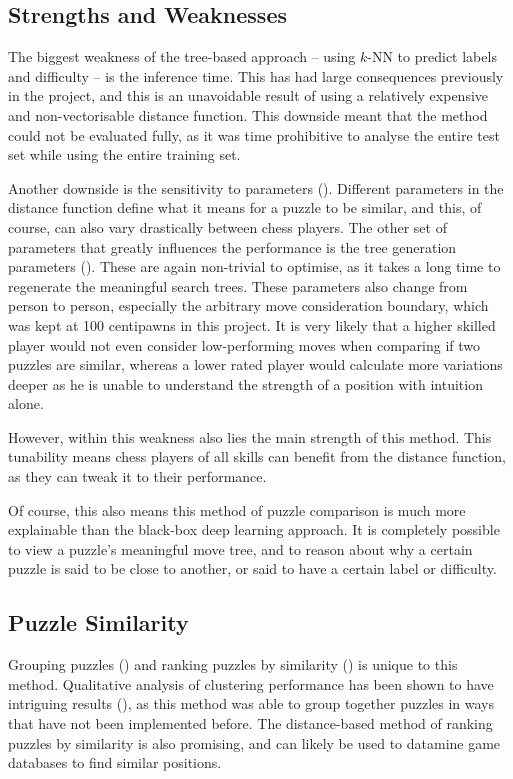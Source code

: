 \subsection{Strengths and Weaknesses}\label{evalS41}

The biggest weakness of the tree-based approach -- using $k$-NN to predict
labels and difficulty -- is the inference time. This has had large consequences
previously in the project, and this is an unavoidable result of using a
relatively expensive and non-vectorisable distance function. This downside
meant that the method could not be evaluated fully, as it was time prohibitive
to analyse the entire test set while using the entire training set.

Another downside is the sensitivity to parameters (). Different
parameters in the distance function define what it means for a puzzle to be
similar, and this, of course, can also vary drastically between chess players.
The other set of parameters that greatly influences the performance is the tree
generation parameters (). These are again non-trivial to
optimise, as it takes a long time to regenerate the meaningful search trees.
These parameters also change from person to person, especially the arbitrary
move consideration boundary, which was kept at 100 centipawns in this project.
It is very likely that a higher skilled player would not even consider
low-performing moves when comparing if two puzzles are similar, whereas a lower
rated player would calculate more variations deeper as he is unable to
understand the strength of a position with intuition alone.

However, within this weakness also lies the main strength of this method. This
tunability means chess players of all skills can benefit from the distance
function, as they can tweak it to their performance.

Of course, this also means this method of puzzle comparison is much more
explainable than the black-box deep learning approach. It is completely
possible to view a puzzle's meaningful move tree, and to reason about why a
certain puzzle is said to be close to another, or said to have a certain label
or difficulty.

\subsection{Puzzle Similarity}\label{evalS42}

Grouping puzzles () and ranking puzzles by similarity
() is unique to this method. Qualitative analysis of clustering
performance has been shown to have intriguing results (), as this
method was able to group together puzzles in ways that have not been
implemented before. The distance-based method of ranking puzzles by similarity
is also promising, and can likely be used to datamine game databases to find
similar positions. 

